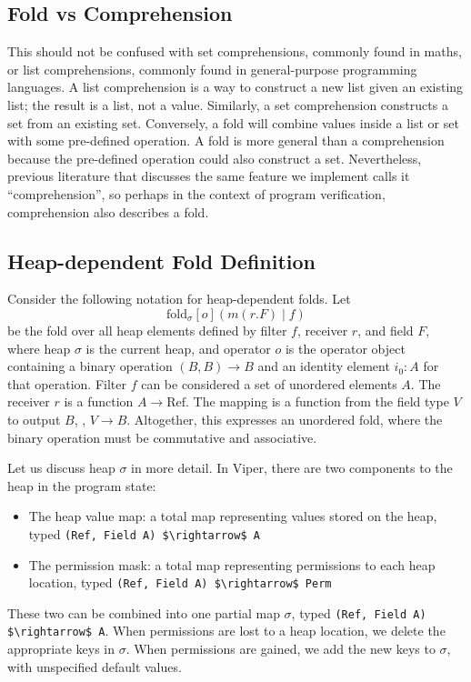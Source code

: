 \documentclass[msc,oneside]{ubcthesis}
\begin{document}
\subsection{Fold vs Comprehension}
This should not be confused with set comprehensions, commonly found in maths, or list comprehensions, commonly found in general-purpose programming languages. A list comprehension is a way to construct a new list given an existing list; the result is a list, not a value. Similarly, a set comprehension constructs a set from an existing set. Conversely, a fold will combine values inside a list or set with some pre-defined operation. A fold is more general than a comprehension because the pre-defined operation could also construct a set. Nevertheless, previous literature that discusses the same feature we implement calls it ``comprehension'', so perhaps in the context of program verification, comprehension also describes a fold. 

\subsection{Heap-dependent Fold Definition}
Consider the following notation for heap-dependent folds.
Let $$\textrm{fold}_{\sigma}[o]( m(r.F) \mid f)$$
be the fold over all heap elements defined by filter $f$, receiver $r$, and field $F$, where heap $\sigma$ is the current heap, and operator $o$ is the operator object containing a binary operation $(B, B) \rightarrow B$ and an identity element $i_0 : A$ for that operation. 
Filter $f$ can be considered a set of unordered elements $A$. The receiver $r$ is a function $A \rightarrow \textrm{Ref}$. The mapping is a function from the field type $V$ to output $B$, \ie, $V\rightarrow B$. Altogether, this expresses an unordered fold, where the binary operation must be commutative and associative. 

Let us discuss heap $\sigma$ in more detail. In Viper, there are two components to the heap in the program state:
\begin{itemize}
    \item The heap value map: a total map representing values stored on the heap, typed \lstinline{(Ref, Field A) $\rightarrow$ A}
    \item The permission mask: a total map representing permissions to each heap location, typed \lstinline{(Ref, Field A) $\rightarrow$ Perm}
\end{itemize}
These two can be combined into one partial map $\sigma$, typed \lstinline{(Ref, Field A) $\rightarrow$ A}. When permissions are lost to a heap location, we delete the appropriate keys in $\sigma$. When permissions are gained, we add the new keys to $\sigma$, with unspecified default values. 
\end{document}
